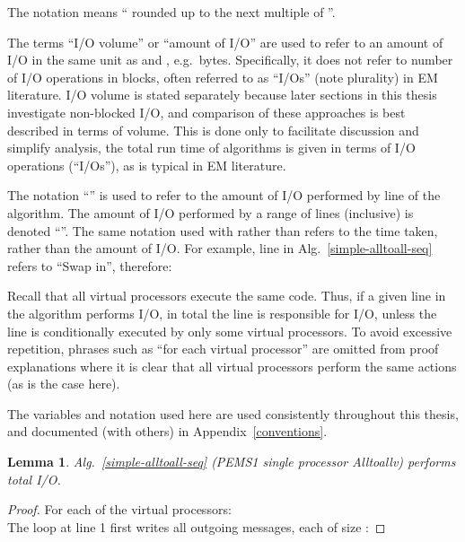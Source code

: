 \documentclass[12pt]{carletoncsthesis}
\newtheorem{lemma}[thm]{Lemma}
\begin{document}
The notation  means `` rounded up to the
next multiple of ''.

The terms ``I/O volume'' or ``amount of I/O'' are used to refer to an amount of
I/O in the same unit as  and , e.g.\ bytes.  Specifically, it does
not refer to number of I/O operations in blocks, often referred to as ``I/Os''
(note plurality) in EM literature.  I/O volume is stated separately because
later sections in this thesis investigate non-blocked I/O, and comparison of
these approaches is best described in terms of volume.  This is done only to
facilitate discussion and simplify analysis, the total run time of algorithms
is given in terms of I/O operations (``I/Os''), as is typical in EM literature.

The notation ``'' is used to refer to the amount of I/O performed by
line  of the algorithm.  The amount of I/O performed by a range of lines
(inclusive) is denoted ``''.  The same notation used with 
rather than  refers to the time taken, rather than the amount of I/O.
For example, line  in
Alg.~\ref{simple-alltoall-seq} refers to ``Swap in'', therefore:


Recall that all  virtual processors execute the same code.  Thus,
if a given line in the algorithm performs  I/O, in total the line is
responsible for  I/O, unless the line is conditionally executed by only
some virtual processors.  To avoid excessive repetition, phrases such as ``for
each virtual processor'' are omitted from proof explanations where it is clear
that all virtual processors perform the same actions (as is the case here).

The variables and notation used here are used consistently throughout this
thesis, and documented (with others) in Appendix~\ref{conventions}.

\begin{lemma}
\label{simple-alltoall-seq-io}
Alg.~\ref{simple-alltoall-seq} (PEMS1 single processor {\sc Alltoallv})
performs  total I/O.
\end{lemma}
\begin{proof}
For each of the  virtual processors:
\\
The loop at line 1 first writes all  outgoing messages, each of size :

\end{proof}
\end{document}
